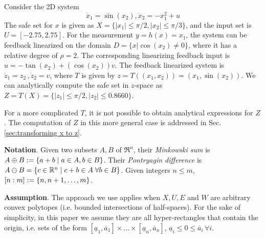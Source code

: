 \begin{exmp}
	Consider the 2D system 
	\begin{equation}
	\label{eq:toy_dynamics}
	\dot{x}_1 = \sin(x_2) , \dot{x}_2 =-x_1^2 + u 
	\end{equation}
	The safe set for $x$ is given as $X = \lbrace |x_1| \leq \pi /2, |x_2| \leq \pi/3 \rbrace$, and the input set is $U = [-2.75, 2.75]$.
	For the measurement $y = h(x) = x_1$, the system can be feedback linearized on the domain $D = \lbrace x | \cos(x_2) \neq 0 \rbrace $, where it has a relative degree of $\rho=2$. 
	The corresponding linearizing feedback input is $u = -\tan(x_2) + (\cos(x_2))v$.
	The feedback linearized system is $\dot{z}_1 = z_2\, ,\dot{z}_2 = v$, where $T$ is given by $z=T((x_1,x_2)) = (x_1, \sin(x_2))$.	
	We can analytically compute the safe set in $z$-space as $Z = T(X) =  \lbrace |z_1| \leq \pi /2, |z_2| \leq 0.8660\rbrace$.
	\exmend
\end{exmp}

For a more complicated $T$, it is not possible to obtain analytical expressions for $Z$. 
The computation of $Z$ in this more general case is addressed in Sec. \ref{sec:transforming x to z}.

\textbf{Notation}.
Given two subsets $A,B$ of $\Re^n$, their \textit{Minkowski sum} is $A\oplus B := \{a+b \;|\; a\in A, b\in B\}$.
Their \emph{Pontryagin difference} is $A\ominus B = \{c \in \mathbb{R}^n \;|\; c+b \in A\; \forall b \in B\}$.
Given integers $n \leq m$, $[n:m] := \{n,n+1,\ldots,m\}$.

\textbf{Assumption}. 
The approach we use applies when $X, U, E$ and $W$ are arbitrary convex polytopes (i.e. bounded intersections of half-spaces).
For the sake of simplicity, in this paper we assume they are all hyper-rectangles that contain the origin, i.e. sets of the form $[\underline{a}_1, \overline{a}_1] \times \ldots \times  [\underline{a}_n, \overline{a}_n]$, $\underline{a}_i \leq 0 \leq \overline{a}_i\,\forall i$.